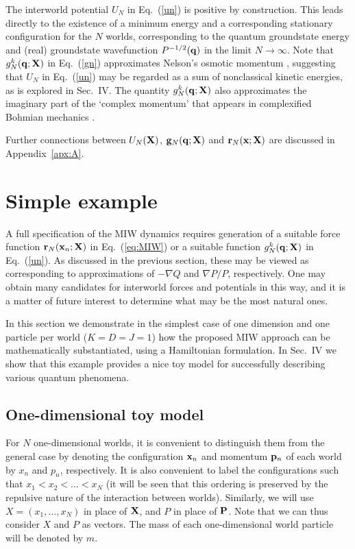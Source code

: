 \documentclass[twocolumn,aps,pra,amsmath,amssymb,superscriptaddress]{revtex4}
\renewcommand{\(}{\left(}
\renewcommand{\)}{\right)}
\newcommand{\blk}{\color{black}}
\newcommand{\blu}{\color{blue}}
\newcommand{\grn}{\color{ngreen}}
\renewcommand\grn{\blk}
\renewcommand\blu{\blk}
\begin{document}
The interworld potential $U_N$ in Eq.~(\ref{un}) is positive by construction.
This  leads directly to the existence of a minimum energy and a corresponding
stationary configuration for the $N$ worlds, corresponding to the quantum
groundstate energy and (real) groundstate wavefunction $P^{-1/2}({\bf q})$ \blk
in the limit $N\to\infty$.  Note that $g_N^k({\bf q} ;{\bf X})$ in
Eq.~(\ref{gn}) approximates Nelson's osmotic momentum \cite{nelson},  suggesting that $U_N$ in Eq.~(\ref{un})
may be regarded as a sum of nonclassical kinetic energies, as is  
explored in Sec.~IV. The quantity $g_N^k({\bf q} ;{\bf X})$  also approximates the imaginary part of the `complex momentum' that appears in complexified Bohmian mechanics \cite{john,wyatt}. 

Further \blk connections between $U_N({\bf X})$, ${\bf g}_N({\bf q}
;{\bf X})$ and ${\bf r}_N({\bf x};{\bf X})$ are discussed in
Appendix~\ref{apx:A}. 



\section{ Simple  example}\label{sec:example}
 
A full specification of the MIW dynamics requires generation of a suitable force
function ${\bf r}_N({\bf x}_n; {\bf X})$  in Eq.~(\ref{eq:MIW})  or a suitable
function $g_N^k({\bf q} ;{\bf X})$ in Eq.~(\ref{un}).  As discussed in the
previous section, these may be viewed as corresponding to approximations of
$-\nabla Q$ and $\nabla P/P$, respectively.
One may obtain many candidates for interworld forces and potentials in this way,
and it is a matter of future interest to determine what may be the most natural
ones.

\grn In this section we demonstrate in the simplest case of one dimension and one
particle per world ($K=D=J=1$) how the proposed MIW approach can be
mathematically substantiated, using a Hamiltonian formulation. \blk
 In
Sec.~IV we show that this example provides a nice toy model for successfully
describing various quantum phenomena.  


\subsection{One-dimensional toy model}

For $N$ one-dimensional worlds, it is convenient to distinguish them from the general case by denoting the configuration ${\bf x}_n$ and momentum ${\bf p}_n$ of each world by $x_n$ and $p_n$, respectively.  It is also convenient to label the configurations such that $x_1< x_2<\dots <x_N$ (it will be seen that this ordering is preserved by the repulsive nature of the interaction between worlds).  Similarly, we will use $X = (x_1, \ldots, x_N)$ in place of ${\bf X}$, 
and $P$ in place of ${\bf P}$. Note that we can thus consider $X$ and $P$ as vectors. \blu The mass of each one-dimensional world particle will be denoted by $m$. \blk 
\end{document}
